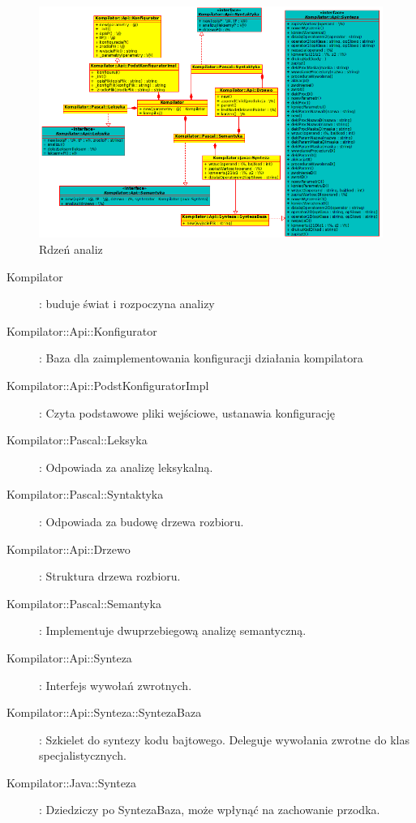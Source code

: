 \documentclass[a4paper,12pt]{article}
\begin{document}
\begin{figure}[h!]
   \includegraphics[width=15cm]{grafika/model/rdzen.png}
   \caption{Rdzeń analiz}
\end{figure}

\begin{description}
	\item[Kompilator]: buduje świat i rozpoczyna analizy
	\item[Kompilator::Api::Konfigurator]: Baza dla zaimplementowania konfiguracji działania kompilatora
	\item[Kompilator::Api::PodstKonfiguratorImpl]: Czyta podstawowe pliki wejściowe, ustanawia konfigurację
	\item[Kompilator::Pascal::Leksyka]: Odpowiada za analizę leksykalną.
	\item[Kompilator::Pascal::Syntaktyka]: Odpowiada za budowę drzewa rozbioru.
	\item[Kompilator::Api::Drzewo]: Struktura drzewa rozbioru.
	\item[Kompilator::Pascal::Semantyka]: Implementuje dwuprzebiegową analizę semantyczną.
	\item[Kompilator::Api::Synteza]: Interfejs wywołań zwrotnych.
	\item[Kompilator::Api::Synteza::SyntezaBaza]: Szkielet do syntezy kodu bajtowego. Deleguje wywołania zwrotne do klas specjalistycznych.
	\item[Kompilator::Java::Synteza]: Dziedziczy po SyntezaBaza, może wpłynąć na zachowanie przodka.
\end{description}
\end{document}
